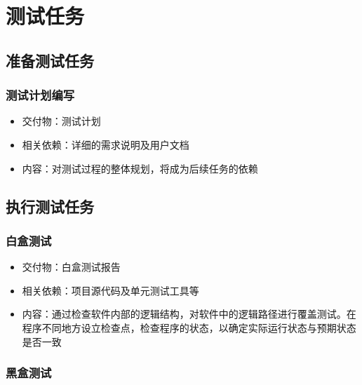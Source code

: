 \documentclass[hyperref, a4paper]{ctexart}
\providecommand{\tightlist}{%
  \setlength{\itemsep}{0pt}\setlength{\parskip}{0pt}}
\begin{document}
\hypertarget{ux6d4bux8bd5ux4efbux52a1}{%
\section{测试任务}\label{ux6d4bux8bd5ux4efbux52a1}}

\hypertarget{ux51c6ux5907ux6d4bux8bd5ux4efbux52a1}{%
\subsection{准备测试任务}\label{ux51c6ux5907ux6d4bux8bd5ux4efbux52a1}}

\hypertarget{ux6d4bux8bd5ux8ba1ux5212ux7f16ux5199}{%
\subsubsection{测试计划编写}\label{ux6d4bux8bd5ux8ba1ux5212ux7f16ux5199}}

\begin{itemize}
\tightlist
\item
  交付物：测试计划
\item
  相关依赖：详细的需求说明及用户文档
\item
  内容：对测试过程的整体规划，将成为后续任务的依赖
\end{itemize}

\hypertarget{ux6267ux884cux6d4bux8bd5ux4efbux52a1}{%
\subsection{执行测试任务}\label{ux6267ux884cux6d4bux8bd5ux4efbux52a1}}

\hypertarget{ux767dux76d2ux6d4bux8bd5}{%
\subsubsection{白盒测试}\label{ux767dux76d2ux6d4bux8bd5}}

\begin{itemize}
\tightlist
\item
  交付物：白盒测试报告
\item
  相关依赖：项目源代码及单元测试工具等
\item
  内容：通过检查软件内部的逻辑结构，对软件中的逻辑路径进行覆盖测试。在程序不同地方设立检查点，检查程序的状态，以确定实际运行状态与预期状态是否一致
\end{itemize}

\hypertarget{ux9ed1ux76d2ux6d4bux8bd5}{%
\subsubsection{黑盒测试}\label{ux9ed1ux76d2ux6d4bux8bd5}}
\end{document}
